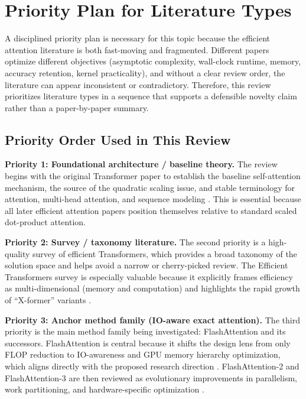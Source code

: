 \documentclass[12pt, a4paper]{article}
\begin{document}
\section{Priority Plan for Literature Types}

A disciplined priority plan is necessary for this topic because the efficient attention literature is both fast-moving and fragmented. Different papers optimize different objectives (asymptotic complexity, wall-clock runtime, memory, accuracy retention, kernel practicality), and without a clear review order, the literature can appear inconsistent or contradictory. Therefore, this review prioritizes literature types in a sequence that supports a defensible novelty claim rather than a paper-by-paper summary.

\subsection{Priority Order Used in This Review}

\textbf{Priority 1: Foundational architecture / baseline theory.}
The review begins with the original Transformer paper to establish the baseline self-attention mechanism, the source of the quadratic scaling issue, and stable terminology for attention, multi-head attention, and sequence modeling \parencite{vaswani2023attentionneed}. This is essential because all later efficient attention papers position themselves relative to standard scaled dot-product attention.

\textbf{Priority 2: Survey / taxonomy literature.}
The second priority is a high-quality survey of efficient Transformers, which provides a broad taxonomy of the solution space and helps avoid a narrow or cherry-picked review. The Efficient Transformers survey is especially valuable because it explicitly frames efficiency as multi-dimensional (memory and computation) and highlights the rapid growth of ``X-former'' variants \parencite{10.1145/3530811}.

\textbf{Priority 3: Anchor method family (IO-aware exact attention).}
The third priority is the main method family being investigated: FlashAttention and its successors. FlashAttention is central because it shifts the design lens from only FLOP reduction to IO-awareness and GPU memory hierarchy optimization, which aligns directly with the proposed research direction \parencite{dao2022flashattentionfastmemoryefficientexact}. FlashAttention-2 and FlashAttention-3 are then reviewed as evolutionary improvements in parallelism, work partitioning, and hardware-specific optimization \parencite{dao2023flashattention2fasterattentionbetter, shah2024flashattention3fastaccurateattention}.
\end{document}
